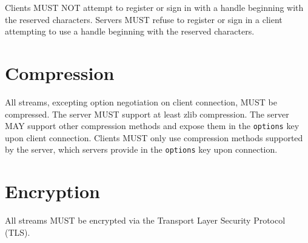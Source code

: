 Clients MUST NOT attempt to register or sign in with a handle beginning with the
reserved characters.  Servers MUST refuse to register or sign in a client
attempting to use a handle beginning with the reserved characters.



\section{Compression}
\sectionrule

All streams, excepting option negotiation on client connection, MUST be
compressed.  The server MUST support at least zlib compression.  The server MAY
support other compression methods and expose them in the \texttt{options} key
upon client connection.  Clients MUST only use compression methods supported by
the server, which servers provide in the \texttt{options} key upon connection.



\section{Encryption}
\sectionrule

All streams MUST be encrypted via the Transport Layer Security Protocol (TLS).
\cite{TLS}
